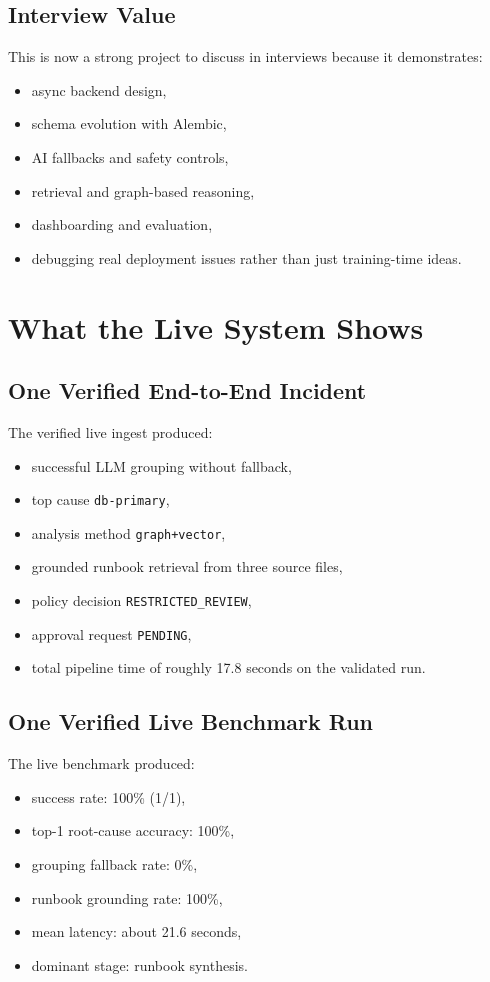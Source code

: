 \documentclass[11pt]{article}
\begin{document}
\subsection{Interview Value}
This is now a strong project to discuss in interviews because it demonstrates:
\begin{itemize}[leftmargin=*]
\item async backend design,
\item schema evolution with Alembic,
\item AI fallbacks and safety controls,
\item retrieval and graph-based reasoning,
\item dashboarding and evaluation,
\item debugging real deployment issues rather than just training-time ideas.
\end{itemize}

\section{What the Live System Shows}
\subsection{One Verified End-to-End Incident}
The verified live ingest produced:
\begin{itemize}[leftmargin=*]
\item successful LLM grouping without fallback,
\item top cause \texttt{db-primary},
\item analysis method \texttt{graph+vector},
\item grounded runbook retrieval from three source files,
\item policy decision \texttt{RESTRICTED\_REVIEW},
\item approval request \texttt{PENDING},
\item total pipeline time of roughly 17.8 seconds on the validated run.
\end{itemize}

\subsection{One Verified Live Benchmark Run}
The live benchmark produced:
\begin{itemize}[leftmargin=*]
\item success rate: 100\% (1/1),
\item top-1 root-cause accuracy: 100\%,
\item grouping fallback rate: 0\%,
\item runbook grounding rate: 100\%,
\item mean latency: about 21.6 seconds,
\item dominant stage: runbook synthesis.
\end{itemize}
\end{document}
